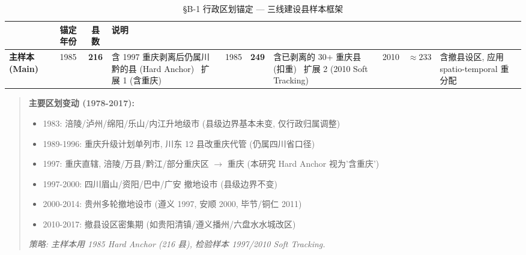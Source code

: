 \begin{table}[htbp]
\centering
\small
\caption{§B-1 行政区划锚定 --- 三线建设县样本框架}
\label{tab:anchoring}
\begin{tabular}{l c c l}
\toprule
 & 锚定年份 & 县数 & 说明 \\
\midrule
\textbf{主样本 (Main)} & 1985 & \textbf{216} & 含 1997 重庆剥离后仍属川黔的县 (Hard Anchor) \
扩展 1 (含重庆) & 1985 & \textbf{249} & 含已剥离的 30+ 重庆县 (扣重) \
扩展 2 (2010 Soft Tracking) & 2010 & $\approx 233$ & 含撤县设区, 应用 spatio-temporal 重分配 \
\bottomrule
\end{tabular}
\begin{quote}\footnotesize
\textbf{主要区划变动 (1978-2017):}
\begin{itemize}
\item 1983: 涪陵/泸州/绵阳/乐山/内江升地级市 (县级边界基本未变, 仅行政归属调整)
\item 1989-1996: 重庆升级计划单列市, 川东 12 县改重庆代管 (仍属四川省口径)
\item 1997: 重庆直辖, 涪陵/万县/黔江/部分重庆区 $\to$ 重庆 (本研究 Hard Anchor 视为'含重庆')
\item 1997-2000: 四川眉山/资阳/巴中/广安 撤地设市 (县级边界不变)
\item 2000-2014: 贵州多轮撤地设市 (遵义 1997, 安顺 2000, 毕节/铜仁 2011)
\item 2010-2017: 撤县设区密集期 (如贵阳清镇/遵义播州/六盘水水城改区)
\end{itemize}
\textit{策略: 主样本用 1985 Hard Anchor (216 县), 检验样本 1997/2010 Soft Tracking.}
\end{quote}
\end{table}